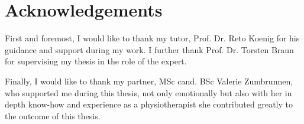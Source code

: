 \chapter*{Acknowledgements}
\label{chap:Acknowledgements}
\renewcommand{\thesection}{\arabic{section}}
\setcounter{section}{0}

First and foremost, I would like to thank my tutor, Prof. Dr. Reto Koenig for his guidance and support during my work.
I further thank Prof. Dr. Torsten Braun for supervising my thesis in the role of the expert.

Finally, I would like to thank my partner, MSc cand. BSc Valerie Zumbrunnen, who supported me during this thesis, not only emotionally but also with her in depth know-how and experience as a physiotherapist she contributed greatly to the outcome of this thesis.